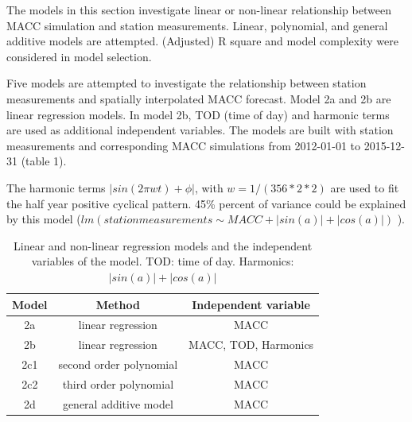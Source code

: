 \documentclass{article}
\begin{document}
The models in this section investigate linear or non-linear relationship between MACC simulation and station measurements. Linear, polynomial, and general additive models are attempted. (Adjusted) R square and model complexity were considered in model selection.  
  
Five models are attempted to investigate the relationship between station measurements and spatially interpolated MACC forecast. Model 2a and 2b are linear regression models. In model 2b, TOD (time of day) and harmonic terms are  used as additional independent variables. The models are built with station measurements and corresponding MACC simulations from 2012-01-01 to 2015-12-31 (table 1).   

The harmonic terms   
$|sin(2 \pi wt) + \phi|$, 
with $w = 1 / (356 * 2 * 2)$ are used to fit the half year positive cyclical pattern. 45\% percent of variance could be explained by this model ($lm (station measurements \sim MACC + |sin(a)| + |cos(a)|)$ ).  

\begin{table}[h!]
\centering
\begin{tabular}{ c c c }
Model & Method & Independent variable\\ \hline 

2a &linear regression & MACC   \\
2b &linear regression & MACC, TOD, Harmonics   \\
2c1 & second order polynomial & MACC \\  
2c2 & third order polynomial & MACC   \\ 
2d & general additive model & MACC  \\  \hline
\end{tabular}
\caption{ Linear and non-linear regression models and the independent variables of the model. TOD: time of day. Harmonics: $ | sin(a)| + |cos(a)|$ } 
\label{table:1}
\end{table}
\end{document}
